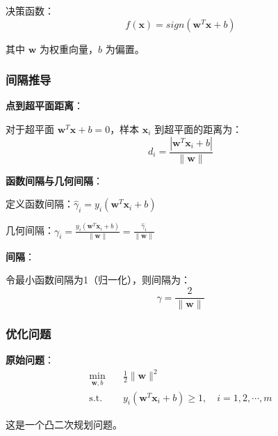 \documentclass[12pt,a4paper]{ctexart}
\begin{document}
决策函数：
\[
f(\mathbf{x}) = sign(\mathbf{w}^T\mathbf{x} + b)
\]

其中 $\mathbf{w}$ 为权重向量，$b$ 为偏置。

\subsubsection{间隔推导}

\textbf{点到超平面距离}：

对于超平面 $\mathbf{w}^T\mathbf{x} + b = 0$，样本 $\mathbf{x}_i$ 到超平面的距离为：
\[
d_i = \frac{|\mathbf{w}^T\mathbf{x}_i + b|}{\|\mathbf{w}\|}
\]

\textbf{函数间隔与几何间隔}：

定义函数间隔：$\hat{\gamma}_i = y_i(\mathbf{w}^T\mathbf{x}_i + b)$

几何间隔：$\gamma_i = \frac{y_i(\mathbf{w}^T\mathbf{x}_i + b)}{\|\mathbf{w}\|} = \frac{\hat{\gamma}_i}{\|\mathbf{w}\|}$

\textbf{间隔}：

令最小函数间隔为1（归一化），则间隔为：
\[
\gamma = \frac{2}{\|\mathbf{w}\|}
\]

\subsubsection{优化问题}

\textbf{原始问题}：
\begin{align}
\min_{\mathbf{w}, b} \quad & \frac{1}{2}\|\mathbf{w}\|^2 \\
\text{s.t.} \quad & y_i(\mathbf{w}^T\mathbf{x}_i + b) \geq 1, \quad i = 1, 2, \cdots, m
\end{align}

这是一个凸二次规划问题。
\end{document}
